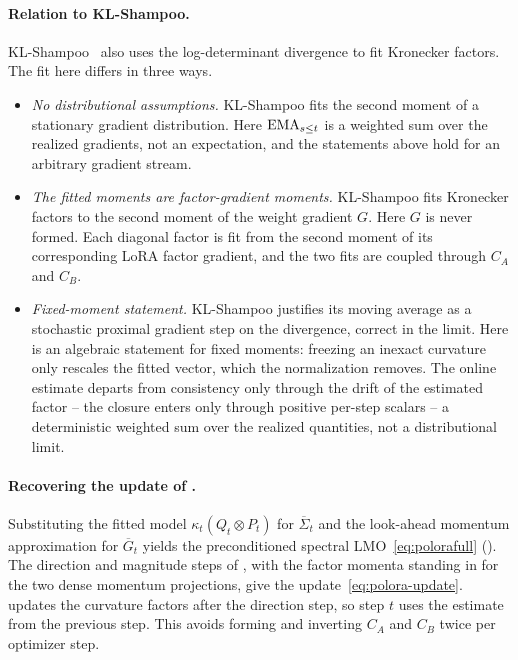 \paragraph{Relation to KL-Shampoo.}
KL-Shampoo~\cite{klshampoo} also uses the log-determinant divergence to
fit Kronecker factors. The fit here differs in three ways.
\begin{itemize}[leftmargin=1.5em,itemsep=1pt,topsep=2pt]
  \item \emph{No distributional assumptions.} KL-Shampoo fits the second
  moment of a stationary gradient distribution. Here $\operatorname{EMA}_{s\le t}$ is a
  weighted sum over the realized gradients, not an expectation, and the
  statements above hold for an arbitrary gradient stream.
  \item \emph{The fitted moments are factor-gradient moments.} KL-Shampoo
  fits Kronecker factors to the second moment of the weight gradient $G$.
  Here $G$ is never formed. Each diagonal factor is fit from the second
  moment of its corresponding LoRA factor gradient, and the two fits are
  coupled through $C_A$ and $C_B$.
  \item \emph{Fixed-moment statement.} KL-Shampoo justifies its moving
  average as a stochastic proximal gradient step on the divergence, correct
  in the limit. Here  is an algebraic statement for
  fixed moments: freezing an inexact curvature only rescales the fitted
  vector, which the normalization removes. The online estimate departs from
  consistency only through the drift of the estimated factor -- the closure
  enters only through positive per-step scalars -- a deterministic weighted sum
  over the realized quantities, not a distributional limit.
\end{itemize}

\paragraph{Recovering the update of .}
Substituting the fitted model $\kappa_t(Q_t\otimes P_t)$ for
$\overline\Sigma_t$ and the look-ahead momentum approximation for
$\overline G_t$ yields the preconditioned spectral
LMO~\eqref{eq:polorafull} (). The
direction and magnitude steps of , with the
factor momenta standing in for the two dense momentum projections, give
the update~\eqref{eq:polora-update}.  updates the
curvature factors after the direction step, so step $t$ uses the estimate
from the previous step. This avoids forming and inverting $C_A$ and
$C_B$ twice per optimizer step.

